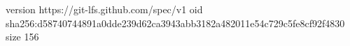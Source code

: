version https://git-lfs.github.com/spec/v1
oid sha256:d58740744891a0dde239d62ca3943abb3182a482011e54c729c5fe8cf92f4830
size 156
